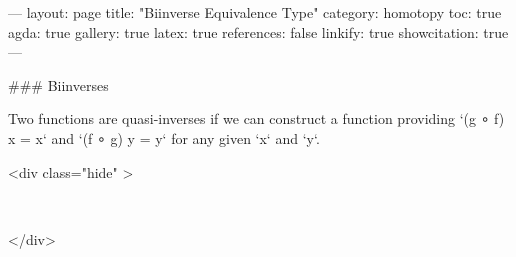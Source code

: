 ---
layout: page
title: "Biinverse Equivalence Type"
category: homotopy
toc: true
agda: true
gallery: true
latex: true
references: false
linkify: true
showcitation: true
---

### Biinverses

Two functions are quasi-inverses if we can construct a function providing
`(g ∘ f) x = x` and `(f ∘ g) y = y` for any given `x` and `y`.

<div class="hide" >
\begin{code}%
\>[0]\AgdaSymbol{\{-\#}\AgdaSpace{}%
\AgdaSpace{}%
\AgdaSpace{}%
\AgdaSymbol{\#-\}}\<%
\\
\>[0]\AgdaSpace{}%
\AgdaSpace{}%
\<%
\end{code}
</div>

\begin{code}%
\>[0]\<%
\\
\>[0][@{}l@{\AgdaIndent{0}}]%
\>[2]\AgdaSpace{}%
\AgdaSymbol{\{}\AgdaSpace{}%
\AgdaSymbol{:}\AgdaSpace{}%
\AgdaSpace{}%
\AgdaSymbol{\}}\AgdaSpace{}%
\AgdaSymbol{\{}\AgdaSpace{}%
\AgdaSymbol{:}\AgdaSpace{}%
\AgdaSpace{}%
\AgdaSymbol{\}}\<%
\\
\>[2][@{}l@{\AgdaIndent{0}}]%
\>[3]\<%
\end{code}


